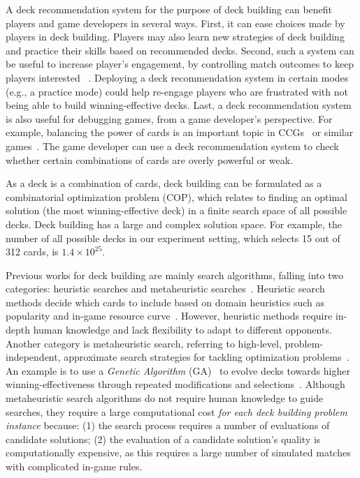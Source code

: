 A deck recommendation system for the purpose of deck building can benefit players and game developers in several ways. First, it can ease choices made by players in deck building. Players may also learn new strategies of deck building and practice their skills based on recommended decks. Second, such a system can be useful to increase player's engagement, by controlling match outcomes to keep players interested ~\cite{chen2017eomm,chen2015analytics}. Deploying a deck recommendation system in certain modes (e.g., a practice mode) could help re-engage players who are frustrated with not being able to build winning-effective decks.  Last, a deck recommendation system is also useful for debugging games, from a game developer's perspective. For example,  balancing the power of cards is an important topic in CCGs~\cite{ham2010rarity} or similar games~\cite{mahlmann2012evolving}. The game developer can use a deck recommendation system to check whether certain combinations of cards are overly powerful or weak.


As a deck is a combination of cards, deck building can be formulated as a combinatorial optimization problem (COP), which relates to finding an optimal solution (the most winning-effective deck) in a finite search space of all possible decks. Deck building has a large and complex solution space. For example, the number of all possible decks in our experiment setting, which selects 15 out of 312 cards, is $1.4 \times 10^{25}$. 

Previous works for deck building are mainly search algorithms, falling into two categories: heuristic searches and metaheuristic searches~\cite{birattari2009tuning}. Heuristic search methods decide which cards to include based on domain heuristics such as popularity and in-game resource curve~\cite{frankkarsten,willfancher,stiegler2016hearthstone}. However, heuristic methods require in-depth human knowledge and lack flexibility to adapt to different opponents. Another category is metaheuristic search, referring to high-level, problem-independent, approximate search strategies for tackling optimization problems~\cite{birattari2009tuning}. An example is to use a \textit{Genetic Algorithm} (GA)~\cite{holland1992adaptation} to evolve decks towards higher winning-effectiveness through repeated modifications and selections~\cite{garcia2016evolutionary,bjorke2017deckbuilding}. Although metaheuristic search algorithms do not require human knowledge to guide searches, they require a large computational cost \textit{for each deck building problem instance} because: (1) the search process requires a number of evaluations of candidate solutions; (2) the evaluation of a candidate solution's quality is computationally expensive, as this requires a large number of simulated matches with complicated in-game rules. 

